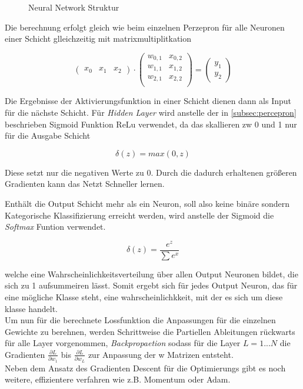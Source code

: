 \begin{figure}[htb]
    \centering
    
    \caption{Neural Network Struktur}
    \label{fig:nn}
\end{figure}



Die berechnung erfolgt gleich wie beim einzelnen Perzepron für alle Neuronen 
einer Schicht glleichzeitig mit matrixmultiplitkation

\begin{equation}
    \label{mat:feedforward}
    \begin{pmatrix}
        x_{0} & x_{1} & x_{2}
    \end{pmatrix}
    \cdot
    \begin{pmatrix}
        w_{0,1} & x_{0,2}\\
        w_{1,1} & x_{1,2}\\
        w_{2,1} & x_{2,2}\\
    \end{pmatrix}
    =
    \begin{pmatrix}
        y_{1}\\
        y_{2}
    \end{pmatrix}
\end{equation}


Die Ergebnisse der Aktivierungsfunktion in einer Schicht dienen 
dann als Input für die nächste Schicht. Für \textit{Hidden Layer}
wird anstelle der in \ref{subsec:percepron} beschrieben Sigmoid 
Funktion ReLu verwendet, da das skallieren zw 0 und 1 nur für die 
Ausgabe Schicht

\begin{equation}
    \label{eq:relu}
    \delta(z) = max(0,z)
\end{equation}

Diese setzt nur die negativen Werte zu 0. Durch die dadurch erhaltenen
größeren Gradienten kann das Netzt Schneller lernen.


Enthält die Output Schicht mehr als ein Neuron, soll also keine binäre sondern 
Kategorische Klassifizierung erreicht werden, wird anstelle der Sigmoid 
die \textit{Softmax} Funtion verwendet.


\begin{equation}
    \label{eq:softmax}
    \delta(z) = \frac{e^{z}}{\sum e^{x}}
\end{equation}

welche eine Wahrscheinlichkeitsverteilung über allen Output 
Neuronen bildet, die sich zu 1 aufsummeiren lässt. Somit ergebt sich
für jedes Output Neuron, das für eine mögliche Klasse steht, eine 
wahrscheinlichkkeit, mit der es sich um diese klasse handelt.
\\
Um nun für die berechnete Lossfunktion die Anpassungen für die 
einzelnen Gewichte zu berehnen, werden Schrittweise die Partiellen
Ableitungen rückwarts für alle Layer vorgenommen, \textit{Backpropaetion}
sodass für die Layer $L = 1...N$ die Gradienten $\frac{\partial L}{\partial 
w_{1}}$ bis $\frac{\partial L}{\partial w_{L}}$ zur Anpassung 
der w Matrizen entsteht.
\\
Neben dem Ansatz des Gradienten Descent für die Optimierungs 
gibt es noch weitere, effizientere verfahren wie z.B. Momentum oder Adam.



